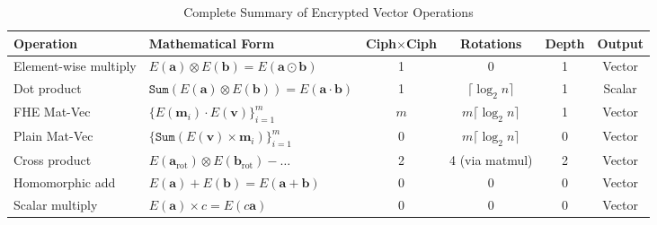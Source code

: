 \documentclass[conference,12pt]{IEEEtran}
\begin{document}
\begin{table}[H]
\centering
\caption{Complete Summary of Encrypted Vector Operations}
\label{tab:all_ops_summary}
\small
\begin{tabular}{@{}lp{4cm}cccc@{}}
\toprule
\textbf{Operation} & \textbf{Mathematical Form} & \textbf{Ciph$\times$Ciph} & \textbf{Rotations} & \textbf{Depth} & \textbf{Output} \\
\midrule
Element-wise multiply & $E(\mathbf{a}) \otimes E(\mathbf{b}) = E(\mathbf{a} \odot \mathbf{b})$ & 1 & 0 & 1 & Vector \\
Dot product & $\texttt{Sum}(E(\mathbf{a}) \otimes E(\mathbf{b})) = E(\mathbf{a} \cdot \mathbf{b})$ & 1 & $\lceil\log_2 n\rceil$ & 1 & Scalar \\
FHE Mat-Vec & $\{E(\mathbf{m}_i) \cdot E(\mathbf{v})\}_{i=1}^m$ & $m$ & $m\lceil\log_2 n\rceil$ & 1 & Vector \\
Plain Mat-Vec & $\{\texttt{Sum}(E(\mathbf{v}) \times \mathbf{m}_i)\}_{i=1}^m$ & 0 & $m\lceil\log_2 n\rceil$ & 0 & Vector \\
Cross product & $E(\mathbf{a}_{\text{rot}}) \otimes E(\mathbf{b}_{\text{rot}}) - \ldots$ & 2 & 4 (via matmul) & 2 & Vector \\
Homomorphic add & $E(\mathbf{a}) + E(\mathbf{b}) = E(\mathbf{a} + \mathbf{b})$ & 0 & 0 & 0 & Vector \\
Scalar multiply & $E(\mathbf{a}) \times c = E(c\mathbf{a})$ & 0 & 0 & 0 & Vector \\
\bottomrule
\end{tabular}
\end{table}




\end{document}
